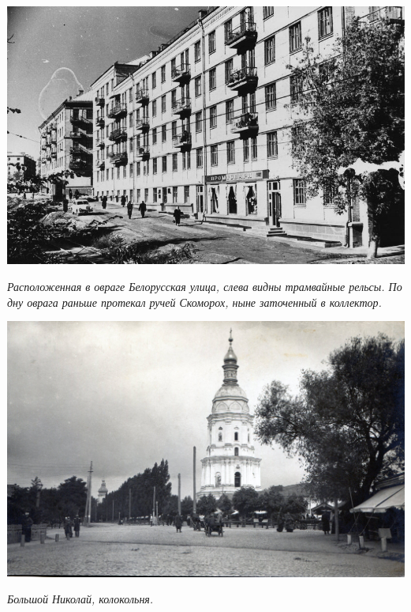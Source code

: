 \begin{center}
\includegraphics[width=\linewidth]{rpix/belor-14.jpg}

\textit{Расположенная в овраге Белорусская улица, слева видны трамвайные рельсы. По дну оврага раньше протекал ручей Скоморох, ныне заточенный в коллектор.}
\end{center}


\begin{center}
\includegraphics[width=\linewidth]{rpix/bolnikolay.jpg}

\textit{Большой Николай, колокольня.}
\end{center}



